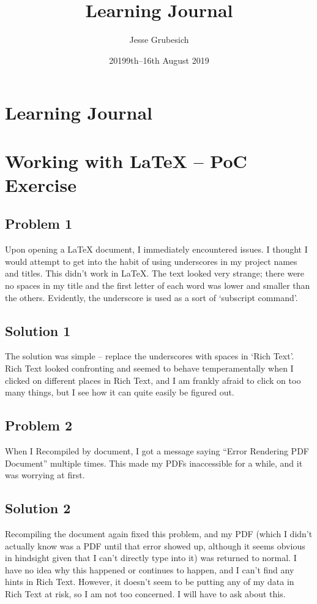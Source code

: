 \documentclass{article}
\title{Learning Journal}
\author{Jesse Grubesich}
\date{2019}
\begin{document}
\maketitle
\tableofcontents
\newpage
\section{Learning Journal}



\date{9th–16th August 2019}

\section{Working with LaTeX – PoC Exercise}
\subsection{Problem 1}
Upon opening a LaTeX document, I immediately encountered issues. I thought I would attempt to get into the habit of using underscores in my project names and titles. This didn’t work in LaTeX. The text looked very strange; there were no spaces in my title and the first letter of each word was lower and smaller than the others. Evidently, the underscore is used as a sort of ‘subscript command’.
\subsection{Solution 1}
The solution was simple – replace the underscores with spaces in ‘Rich Text’. Rich Text looked confronting and seemed to behave temperamentally when I clicked on different places in Rich Text, and I am frankly afraid to click on too many things, but I see how it can quite easily be figured out.

\subsection{Problem 2}
When I Recompiled by document, I got a message saying “Error Rendering PDF Document” multiple times. This made my PDFs inaccessible for a while, and it was worrying at first.
\subsection{Solution 2}
Recompiling the document again fixed this problem, and my PDF (which I didn’t actually know was a PDF until that error showed up, although it seems obvious in hindsight given that I can’t directly type into it) was returned to normal. I have no idea why this happened or continues to happen, and I can’t find any hints in Rich Text. However, it doesn’t seem to be putting any of my data in Rich Text at risk, so I am not too concerned. I will have to ask about this.
\end{document}
